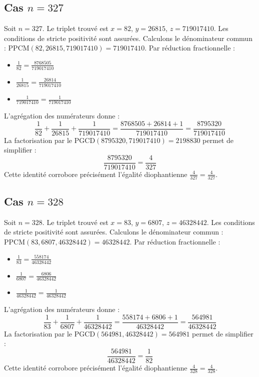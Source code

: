 \documentclass[11pt,a4paper]{article}
\begin{document}
\subsection{Cas $n = 327$}
Soit $n = 327$. Le triplet trouvé est $x = 82$, $y = 26815$, $z = 719017410$.
Les conditions de stricte positivité sont assurées.
Calculons le dénominateur commun : $\text{PPCM}(82, 26815, 719017410) = 719017410$.
Par réduction fractionnelle :
\begin{itemize}
    \item $\frac{1}{82} = \frac{8768505}{719017410}$
    \item $\frac{1}{26815} = \frac{26814}{719017410}$
    \item $\frac{1}{719017410} = \frac{1}{719017410}$
\end{itemize}
L'agrégation des numérateurs donne :
$$ \frac{1}{82} + \frac{1}{26815} + \frac{1}{719017410} = \frac{8768505 + 26814 + 1}{719017410} = \frac{8795320}{719017410} $$
La factorisation par le $\text{PGCD}(8795320, 719017410) = 2198830$ permet de simplifier :
$$ \frac{8795320}{719017410} = \frac{4}{327} $$
Cette identité corrobore précisément l'égalité diophantienne $\frac{4}{327} = \frac{4}{327}$.

\subsection{Cas $n = 328$}
Soit $n = 328$. Le triplet trouvé est $x = 83$, $y = 6807$, $z = 46328442$.
Les conditions de stricte positivité sont assurées.
Calculons le dénominateur commun : $\text{PPCM}(83, 6807, 46328442) = 46328442$.
Par réduction fractionnelle :
\begin{itemize}
    \item $\frac{1}{83} = \frac{558174}{46328442}$
    \item $\frac{1}{6807} = \frac{6806}{46328442}$
    \item $\frac{1}{46328442} = \frac{1}{46328442}$
\end{itemize}
L'agrégation des numérateurs donne :
$$ \frac{1}{83} + \frac{1}{6807} + \frac{1}{46328442} = \frac{558174 + 6806 + 1}{46328442} = \frac{564981}{46328442} $$
La factorisation par le $\text{PGCD}(564981, 46328442) = 564981$ permet de simplifier :
$$ \frac{564981}{46328442} = \frac{1}{82} $$
Cette identité corrobore précisément l'égalité diophantienne $\frac{4}{328} = \frac{4}{328}$.
\end{document}
